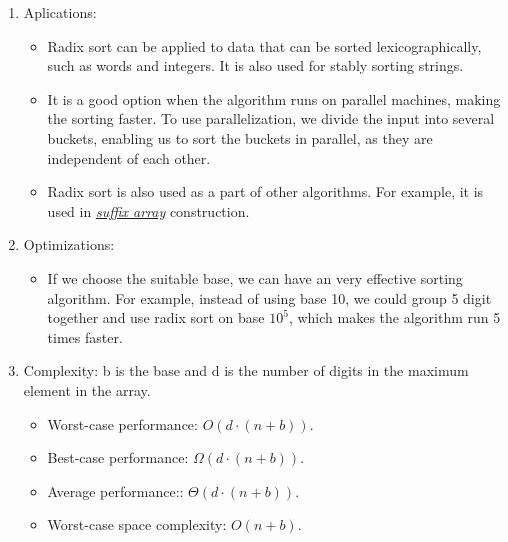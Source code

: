 \documentclass[12pt]{article}
\begin{document}
\begin{enumerate}
\begin{algorithm}[H]
        \end{algorithm}
        \item Aplications:
        \begin{itemize}
            \item Radix sort can be applied to data that can be sorted lexicographically, such as words and integers. It is also used for stably sorting strings. 
            \item It is a good option when the algorithm runs on parallel machines, making the sorting faster. To use parallelization, we divide the input into several buckets, enabling us to sort the buckets in parallel, as they are independent of each other. 
            \item Radix sort is also used as a part of other algorithms. For example, it is used in \href{https://cp-algorithms.com/string/suffix-array.html}{\emph{suffix array}} construction.
        \end{itemize}
        \item Optimizations: 
        \begin{itemize}
            \item If we choose the suitable base, we can have an very effective sorting algorithm. For example, instead of using base 10, we could group 5 digit together and use radix sort on base $10^5$, which makes the algorithm run 5 times faster.
        \end{itemize}
        \item Complexity: b is the base and d is the number of digits in the maximum element in the array.
        \begin{itemize}
            \item Worst-case performance: $O(d\cdot (n+b))$.
            \item Best-case performance: $\Omega(d\cdot (n+b))$.
            \item Average performance:: $\Theta(d\cdot (n+b))$.
            \item Worst-case space complexity: $O(n+b)$.
        \end{itemize}
    \end{enumerate}
\end{document}
